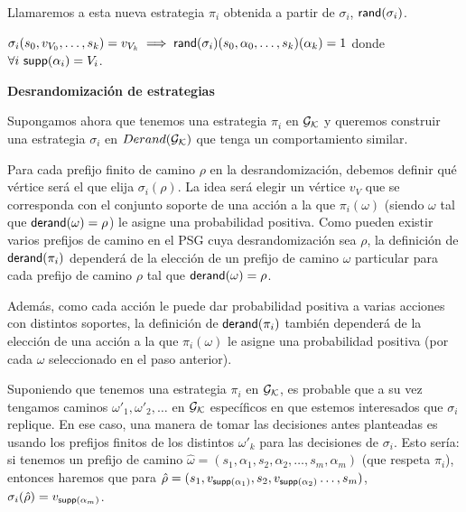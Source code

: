 Llamaremos a esta nueva estrategia $\pi_i$ obtenida a partir de $\sigma_i$,
$\textsf{rand}(\sigma_i)$.

\begin{center}
	$\sigma_i(s_0, v_{V_0}, \dots, s_k) = v_{V_k} \implies \textsf{rand}(\sigma_i)(s_0, \alpha_0, \dots, s_k)(\alpha_k) = 1$ donde \\ $\forall i \ \textsf{supp}(\alpha_i) = V_i$.
\end{center}

\textbf{Desrandomización de estrategias}

Supongamos ahora que tenemos una estrategia $\pi_i$ en $\mathcal{G}_{\mathcal{K}}$ y queremos
construir una estrategia $\sigma_i$ en $Derand(\mathcal{G}_{\mathcal{K}})$ que tenga un comportamiento
similar.

Para cada prefijo finito de camino $\rho$ en la desrandomización, debemos
definir qué vértice será el que elija $\sigma_i(\rho)$. La idea será elegir un
vértice $v_V$ que se corresponda con el conjunto soporte de una acción a la que
$\pi_i(\omega)$ (siendo $\omega$ tal que $\textsf{derand}(\omega) = \rho$) le asigne
una probabilidad positiva. Como pueden existir varios prefijos de camino en el
PSG cuya desrandomización sea $\rho$, la definición de $\textsf{derand}(\pi_i)$
dependerá de la elección de un prefijo de camino $\omega$ particular para cada
prefijo de camino $\rho$ tal que $\textsf{derand}(\omega) = \rho$.

Además, como cada acción le puede dar probabilidad positiva a varias acciones
con distintos soportes, la definición de $\textsf{derand}(\pi_i)$ también dependerá de
la elección de una acción a la que $\pi_i(\omega)$ le asigne una probabilidad
positiva (por cada $\omega$ seleccionado en el paso anterior).

\begin{boxgris}{}
	Suponiendo que tenemos una estrategia $\pi_i$ en $\mathcal{G}_{\mathcal{K}}$, es probable que a su vez tengamos caminos $\omega'_1, \omega'_2, \dots$ en $\mathcal{G}_{\mathcal{K}}$ específicos en que estemos interesados que $\sigma_i$ replique. En ese caso, una manera de tomar las decisiones antes planteadas es usando los prefijos finitos de los distintos $\omega'_k$ para las decisiones de $\sigma_i$. Esto sería: si tenemos un prefijo de camino $\hat \omega = (s_1, \alpha_1, s_2, \alpha_2, \dots, s_m, \alpha_m)$ (que respeta $\pi_i$), entonces haremos que para $\hat \rho = (s_1, v_{\textsf{supp}(\alpha_1)}, s_2, v_{\textsf{supp}(\alpha_2)} \dots, s_m)$, $\sigma_i(\hat \rho) = v_{\textsf{supp}(\alpha_m)}$.
\end{boxgris}

